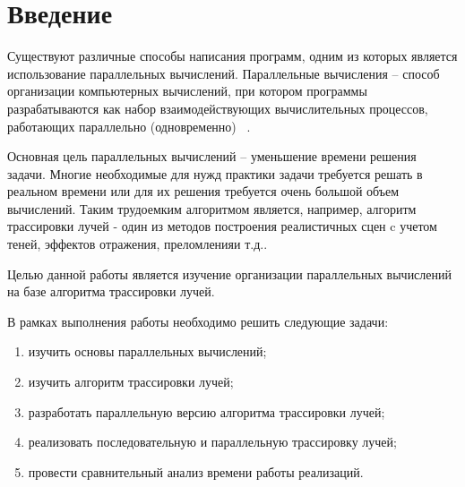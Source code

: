 \chapter*{Введение}

Существуют различные способы написания программ, одним из которых является использование параллельных вычислений. Параллельные вычисления – способ организации компьютерных вычислений, при котором программы разрабатываются как набор взаимодействующих вычислительных процессов, работающих параллельно (одновременно) ~\cite{first_article}. 

Основная цель параллельных вычислений – уменьшение времени
решения задачи. Многие необходимые для нужд практики задачи требуется решать в реальном времени или для их решения требуется очень большой объем вычислений. Таким трудоемким алгоритмом является, например, алгоритм трассировки лучей - один из методов построения реалистичных сцен c учетом теней, эффектов отражения, преломленияи т.д..

Целью данной работы является изучение организации параллельных вычислений на базе алгоритма трассировки лучей.


В рамках выполнения работы необходимо решить следующие задачи: 
\begin{enumerate}[label={\arabic*)}]
	\item изучить основы параллельных вычислений;
	\item изучить алгоритм трассировки лучей;
	\item разработать параллельную версию алгоритма трассировки лучей;
	\item реализовать последовательную и параллельную трассировку лучей;
	\item провести сравнительный анализ времени работы реализаций.
\end{enumerate}
